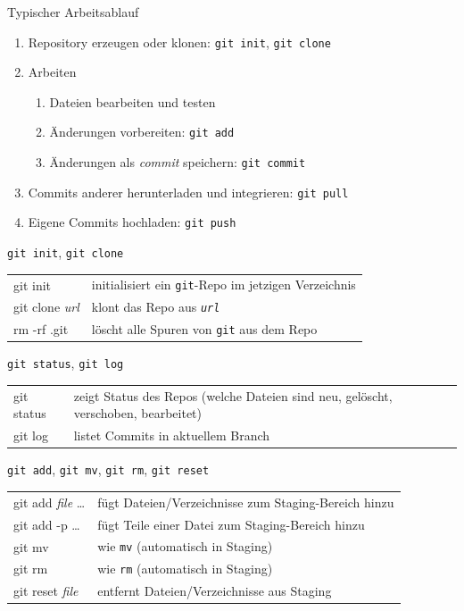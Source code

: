 \begin{frame}{Typischer Arbeitsablauf}
  \begin{enumerate}
    \item Repository erzeugen oder klonen: \texttt{git init}, \texttt{git clone}
    \item Arbeiten
      \begin{enumerate}
        \item Dateien bearbeiten und testen
        \item Änderungen vorbereiten: \texttt{git add}
        \item Änderungen als \emph{commit} speichern: \texttt{git commit}
      \end{enumerate}
    \item Commits anderer herunterladen und integrieren: \texttt{git pull}
    \item Eigene Commits hochladen: \texttt{git push}
  \end{enumerate}
\end{frame}

\begin{frame}{\texttt{git init}, \texttt{git clone}}
  \begin{tabu}{>{\ttfamily}l X[,L]}
    git init               & initialisiert ein \texttt{git}-Repo im jetzigen Verzeichnis \\
    git clone \textit{url} & klont das Repo aus \texttt{\textit{url}} \\
    rm -rf .git            & löscht alle Spuren von \texttt{git} aus dem Repo
  \end{tabu}
\end{frame}

\begin{frame}{\texttt{git status}, \texttt{git log}}
  \begin{tabu}{>{\ttfamily}l X[,L]}
    git status & zeigt Status des Repos (welche Dateien sind neu, gelöscht, verschoben, bearbeitet) \\
    git log    & listet Commits in aktuellem Branch
  \end{tabu}
\end{frame}

\begin{frame}{\texttt{git add}, \texttt{git mv}, \texttt{git rm}, \texttt{git reset}}
  \begin{tabu}{>{\ttfamily}l X[,L]}
    git add \textit{file} … & fügt Dateien/Verzeichnisse zum Staging-Bereich hinzu \\
    git add -p …            & fügt Teile einer Datei zum Staging-Bereich hinzu \\
    git mv                  & wie \texttt{mv} (automatisch in Staging)\\
    git rm                  & wie \texttt{rm} (automatisch in Staging) \\
    git reset \textit{file} & entfernt Dateien/Verzeichnisse aus Staging
  \end{tabu}
\end{frame}

